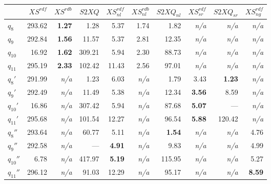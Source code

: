 \begin{tabular}{lrrrrrrrrr}
\toprule
  & $\mathit{XS^{rdf}}$      & $\mathit{XS^{rdb}}$      & $\mathit{S2XQ}$          & $\mathit{XS^{rdf}_{nl}}$ & $\mathit{XS^{rdb}_{nl}}$ & $\mathit{S2XQ_{nl}}$     & $\mathit{XS^{rdf}_{sr}}$ & $\mathit{S2XQ_{sr}}$     & $\mathit{XS^{rdf}_{ng}}$ \\
\midrule
$q_{8}$  & 293.62   & \textbf{1.27}  & 1.28   & 5.37   & 1.74   & 1.82   & \textit{n/a} & \textit{n/a} & \textit{n/a} \\[0.15em]
$q_{9}$  & 292.84   & \textbf{1.56}  & 11.57   & 5.37   & 2.81   & 12.35   & \textit{n/a} & \textit{n/a} & \textit{n/a} \\[0.15em]
$q_{10}$  & 16.92   & \textbf{1.62}  & 309.21   & 5.94   & 2.30   & 88.73   & \textit{n/a} & \textit{n/a} & \textit{n/a} \\[0.15em]
$q_{11}$  & 295.19   & \textbf{2.33}  & 102.42   & 11.43   & 2.56   & 97.01   & \textit{n/a} & \textit{n/a} & \textit{n/a} \\[0.15em]
\midrule $q_{8}'$  & 291.99   & \textit{n/a} & 1.23   & 6.03   & \textit{n/a} & 1.79   & 3.43   & \textbf{1.23}  & \textit{n/a} \\[0.15em]
$q_{9}'$  & 292.49   & \textit{n/a} & 11.49   & 5.38   & \textit{n/a} & 12.34   & \textbf{3.56}  & 8.59   & \textit{n/a} \\[0.15em]
$q_{10}'$  & 16.86   & \textit{n/a} & 307.42   & 5.94   & \textit{n/a} & 87.68   & \textbf{5.07}  &  --- & \textit{n/a} \\[0.15em]
$q_{11}'$  & 295.68   & \textit{n/a} & 101.54   & 12.27   & \textit{n/a} & 96.54   & \textbf{5.88}  & 120.42   & \textit{n/a} \\[0.15em]
\midrule $q_{8}''$  & 293.64   & \textit{n/a} & 60.77   & 5.11   & \textit{n/a} & \textbf{1.54}  & \textit{n/a} & \textit{n/a} & 4.76   \\[0.15em]
$q_{9}''$  & 292.58   & \textit{n/a} &  --- & \textbf{4.91}  & \textit{n/a} & 9.83   & \textit{n/a} & \textit{n/a} & 4.99   \\[0.15em]
$q_{10}''$  & 6.78   & \textit{n/a} & 417.97   & \textbf{5.19}  & \textit{n/a} & 115.95   & \textit{n/a} & \textit{n/a} & 5.27   \\[0.15em]
$q_{11}''$  & 296.12   & \textit{n/a} & 91.03   & 12.29   & \textit{n/a} & 95.17   & \textit{n/a} & \textit{n/a} & \textbf{8.59}  \\[0.15em]
\bottomrule
\end{tabular}
